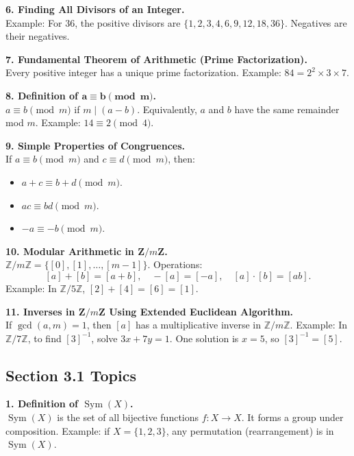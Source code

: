 \documentclass[10pt]{article}
\begin{document}
\textbf{6. Finding All Divisors of an Integer.}\\
Example: For \(36\), the positive divisors are \(\{1,2,3,4,6,9,12,18,36\}\). Negatives are their negatives.

\textbf{7. Fundamental Theorem of Arithmetic (Prime Factorization).}\\
Every positive integer has a unique prime factorization. Example: \(84 = 2^2 \times 3 \times 7\).

\textbf{8. Definition of \(\mathbf{a \equiv b \pmod{m}}\).}\\
\(a \equiv b \pmod{m}\) if \(m \mid (a - b)\). Equivalently, \(a\) and \(b\) have the same remainder mod \(m\). Example: \(14 \equiv 2 \pmod{4}\).

\textbf{9. Simple Properties of Congruences.}\\
If \(a \equiv b \pmod{m}\) and \(c \equiv d \pmod{m}\), then:
\begin{itemize}
\item \(a + c \equiv b + d \pmod{m}\).
\item \(ac \equiv bd \pmod{m}\).
\item \(-a \equiv -b \pmod{m}\).
\end{itemize}

\textbf{10. Modular Arithmetic in \(\mathbf{Z}/m\mathbf{Z}\).}\\
\(\mathbb{Z}/m\mathbb{Z} = \{ [0],[1],\ldots,[m-1] \}\). Operations:
\[
[a] + [b] = [a+b], \quad -[a] = [-a], \quad [a]\cdot[b] = [ab].
\]
Example: In \(\mathbb{Z}/5\mathbb{Z}\), \([2] + [4] = [6] = [1]\).

\textbf{11. Inverses in \(\mathbf{Z}/m\mathbf{Z}\) Using Extended Euclidean Algorithm.}\\
If \(\gcd(a,m)=1\), then \([a]\) has a multiplicative inverse in \(\mathbb{Z}/m\mathbb{Z}\). Example: In \(\mathbb{Z}/7\mathbb{Z}\), to find \([3]^{-1}\), solve \(3x+7y=1\). One solution is \(x=5\), so \([3]^{-1}=[5]\).

\subsection*{Section 3.1 Topics}

\textbf{1. Definition of \(\operatorname{Sym}(X)\).}\\
\(\operatorname{Sym}(X)\) is the set of all bijective functions \(f: X \to X\). It forms a group under composition. Example: if \(X = \{1,2,3\}\), any permutation (rearrangement) is in \(\operatorname{Sym}(X)\).
\end{document}
